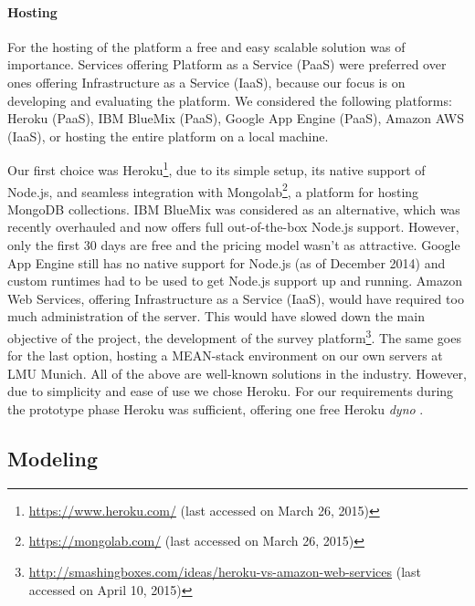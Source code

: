	\paragraph{Hosting}

		For the hosting of the platform a free and easy scalable solution was of importance. Services offering Platform as a Service (PaaS) were preferred over ones offering Infrastructure as a Service (IaaS), because our focus is on developing and evaluating the platform. We considered the following platforms: Heroku (PaaS), IBM BlueMix (PaaS), Google App Engine (PaaS), Amazon AWS (IaaS), or hosting the entire platform on a local machine.

		Our first choice was Heroku\footnote{\url{https://www.heroku.com/} (last accessed on March 26, 2015)}, due to its simple setup, its native support of Node.js, and seamless integration with Mongolab\footnote{\url{https://mongolab.com/} (last accessed on March 26, 2015)}, a platform for hosting MongoDB collections.
		IBM BlueMix was considered as an alternative, which was recently overhauled and now offers full out-of-the-box Node.js support. However, only the first 30 days are free and the pricing model wasn't as attractive. Google App Engine still has no native support for Node.js (as of December 2014) and custom runtimes had to be used to get Node.js support up and running. Amazon Web Services, offering Infrastructure as a Service (IaaS), would have required too much administration of the server. This would have slowed down the main objective of the project, the development of the survey platform\footnote{\url{http://smashingboxes.com/ideas/heroku-vs-amazon-web-services} (last accessed on April 10, 2015)}. The same goes for the last option, hosting a MEAN-stack environment on our own servers at LMU Munich. All of the above are well-known solutions in the industry. However, due to simplicity and ease of use we chose Heroku. For our requirements during the prototype phase Heroku was sufficient, offering one free Heroku \textit{dyno} \cite{Heroku2014Dyno}.






\clearpage

\subsection{Modeling}
\label{chapter:implementation:modeling}

